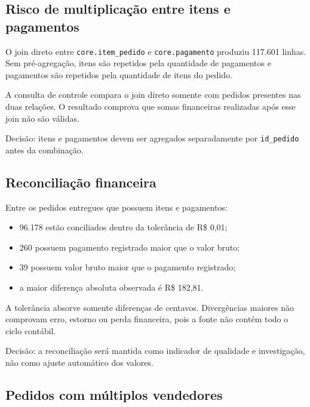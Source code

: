\documentclass[12pt,a4paper]{article}
\providecommand{\tightlist}{
  \setlength{\itemsep}{0pt}\setlength{\parskip}{0pt}
}
\begin{document}
\subsection{Risco de multiplicação entre itens e
pagamentos}\label{docs__analytics__evidencias_consultas_basicas_core.md__risco-de-multiplicauxe7uxe3o-entre-itens-e-pagamentos}

O join direto entre \nolinkurl{core.item_pedido} e
\nolinkurl{core.pagamento} produziu 117.601 linhas. Sem pré-agregação,
itens são repetidos pela quantidade de pagamentos e pagamentos são
repetidos pela quantidade de itens do pedido.

A consulta de controle compara o join direto somente com pedidos
presentes nas duas relações. O resultado comprova que somas financeiras
realizadas após esse join não são válidas.

Decisão: itens e pagamentos devem ser agregados separadamente por
\nolinkurl{id_pedido} antes da combinação.

\subsection{Reconciliação
financeira}\label{docs__analytics__evidencias_consultas_basicas_core.md__reconciliauxe7uxe3o-financeira}

Entre os pedidos entregues que possuem itens e pagamentos:

\begin{itemize}
\tightlist
\item
  96.178 estão conciliados dentro da tolerância de R\$ 0,01;
\item
  260 possuem pagamento registrado maior que o valor bruto;
\item
  39 possuem valor bruto maior que o pagamento registrado;
\item
  a maior diferença absoluta observada é R\$ 182,81.
\end{itemize}

A tolerância absorve somente diferenças de centavos. Divergências
maiores não comprovam erro, estorno ou perda financeira, pois a fonte
não contém todo o ciclo contábil.

Decisão: a reconciliação será mantida como indicador de qualidade e
investigação, não como ajuste automático dos valores.

\subsection{Pedidos com múltiplos
vendedores}\label{docs__analytics__evidencias_consultas_basicas_core.md__pedidos-com-muxfaltiplos-vendedores}
\end{document}
